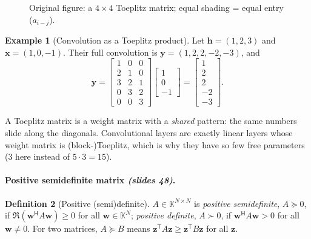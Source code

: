 \documentclass[11pt,a4paper]{article}
\newcommand{\K}{\mathbb{K}}
\newcommand{\T}{^{\mathsf{T}}}
\newcommand{\Her}{^{\mathsf{H}}}
\newcommand{\slides}[1]{\texorpdfstring{\emph{(slides #1)}}{(slides #1)}}
\theoremstyle{definition}
\newtheorem{definition}{Definition}[section]
\newtheorem{example}[definition]{Example}
\theoremstyle{plain}
\begin{document}
\begin{figure}[ht]
\centering
{}
\caption{Original figure: a $4\times4$ Toeplitz matrix; equal shading = equal entry ($a_{i-j}$).}
\end{figure}

\begin{example}[Convolution as a Toeplitz product]
Let $\mathbf h=(1,2,3)$ and $\mathbf x=(1,0,-1)$. Their full convolution is $\mathbf y=(1,2,2,-2,-3)$, and
\[
\mathbf y=\begin{bmatrix}1&0&0\\2&1&0\\3&2&1\\0&3&2\\0&0&3\end{bmatrix}\begin{bmatrix}1\\0\\-1\end{bmatrix}=\begin{bmatrix}1\\2\\2\\-2\\-3\end{bmatrix}.
\]
\end{example}

\begin{intuition}
A Toeplitz matrix is a weight matrix with a \emph{shared} pattern: the same numbers slide along the diagonals. Convolutional layers are exactly linear layers whose weight matrix is (block-)Toeplitz, which is why they have so few free parameters ($3$ here instead of $5\cdot3=15$).
\end{intuition}

\paragraph{Positive semidefinite matrix \slides{48}.}
\begin{definition}[Positive (semi)definite]
$A\in\K^{N\times N}$ is \emph{positive semidefinite}, $A\succeq0$, if $\Re(\mathbf w\Her A\mathbf w)\ge0$ for all $\mathbf w\in\K^N$; \emph{positive definite}, $A\succ0$, if $\mathbf w\Her A\mathbf w>0$ for all $\mathbf w\ne0$. For two matrices, $A\succeq B$ means $\mathbf z\T A\mathbf z\ge\mathbf z\T B\mathbf z$ for all $\mathbf z$.
\end{definition}
\end{document}
